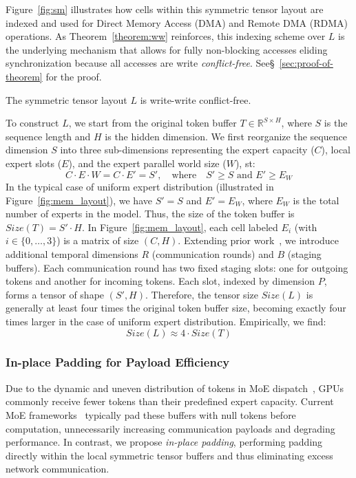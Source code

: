Figure~\ref{fig:sm} illustrates how cells within this symmetric tensor layout are indexed
and used for Direct Memory Access (DMA) and Remote DMA (RDMA) operations.
As Theorem~\ref{theorem:ww} reinforces,
this indexing scheme over $L$ is the underlying mechanism that allows for fully non-blocking accesses eliding
synchronization because all accesses are write \emph{conflict-free}.
See\S~\ref{sec:proof-of-theorem} for the proof.
\begin{theorem}\label{theorem:ww}
   The symmetric tensor layout $L$ is write-write conflict-free.
\end{theorem}
To construct $L$, we start from the original token buffer $T \in \mathbb{R}^{S \times H}$, where $S$ is the sequence length and $H$ is the hidden dimension. We first reorganize the sequence dimension $S$ into three sub-dimensions representing the expert capacity ($C$), local expert slots ($E$), and the expert parallel world size ($W$), st:
\[
C \cdot E \cdot W = C \cdot E' = S', \quad\text{where}\quad S' \geq S \text{ and } E' \geq E_W
\]
In the typical case of uniform expert distribution (illustrated in Figure~\ref{fig:mem_layout}),
we have $S' = S$ and $E' = E_W$, where $E_W$ is the total number of experts in the model.
Thus, the size of the token buffer is $Size(T) = S' \cdot H$.
In Figure~\ref{fig:mem_layout}, each cell labeled $E_i$ (with $i \in \{0,\ldots,3\}$) is a matrix of size $(C, H)$.
Extending prior work~\cite{DBLP:conf/iclr/LepikhinLXCFHKS21, comet}, we introduce additional temporal dimensions $R$ (communication rounds) and $B$ (staging buffers). Each communication round has two fixed staging slots: one for outgoing tokens and another for incoming tokens. Each slot, indexed by dimension $P$, forms a tensor of shape $(S', H)$. Therefore, the tensor size $Size(L)$ is generally at least four times the original token buffer size, becoming exactly four times larger in the case of uniform expert distribution. Empirically, we find:
\[
    Size(L) \approx 4 \cdot Size(T)
\]

\subsubsection{In-place Padding for Payload Efficiency}\label{subsubsec:payload}
Due to the dynamic and uneven distribution of tokens in MoE dispatch~\cite{bmamba}, GPUs commonly receive fewer tokens than their predefined expert capacity. Current MoE frameworks~\cite{pmlr-v162-rajbhandari22a} typically pad these buffers with null tokens before computation, unnecessarily increasing communication payloads and degrading performance. In contrast, we propose \emph{in-place padding}, performing padding directly within the local symmetric tensor buffers and thus eliminating excess network communication.

